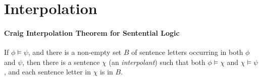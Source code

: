 \section{Interpolation}


\paragraph{Craig Interpolation Theorem for Sentential Logic}

\begin{theorem}\label{thmcraig}If $\phi 
\vDash \psi$, and there is a non-empty set $B$ of sentence letters occurring in both $\phi$ and
$\psi$, then there is a sentence $\chi$ (an \emph{interpolant}) such that both $\phi \vDash \chi$ and
$\chi \vDash \psi$, and each sentence letter in $\chi$ is in $B$. \end{theorem}

